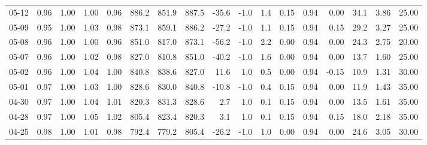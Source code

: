 \begin{threeparttable}
{\begin{tabular}{lrrrrrrrrrrrrrrrr}
  05-12 &         0.96 &           1.00 &          1.00 &          0.96 & 886.2 & 851.9 & 887.5 &      -35.6 &                     -1.0 &                 1.4 &       0.15 &      0.94 &           0.00 &             34.1 &            3.86 &                  25.00 \\
  05-09 &         0.95 &           1.00 &          1.03 &          0.98 & 873.1 & 859.1 & 886.2 &      -27.2 &                     -1.0 &                 1.1 &       0.15 &      0.94 &           0.15 &             29.2 &            3.27 &                  25.00 \\
  05-08 &         0.96 &           1.00 &          1.00 &          0.96 & 851.0 & 817.0 & 873.1 &      -56.2 &                     -1.0 &                 2.2 &       0.00 &      0.94 &           0.00 &             24.3 &            2.75 &                  20.00 \\
  05-07 &         0.96 &           1.00 &          1.02 &          0.98 & 827.0 & 810.8 & 851.0 &      -40.2 &                     -1.0 &                 1.6 &       0.00 &      0.94 &           0.00 &             13.7 &            1.60 &                  25.00 \\
  05-02 &         0.96 &           1.00 &          1.04 &          1.00 & 840.8 & 838.6 & 827.0 &       11.6 &                      1.0 &                 0.5 &       0.00 &      0.94 &          -0.15 &             10.9 &            1.31 &                  30.00 \\
  05-01 &         0.97 &           1.00 &          1.03 &          1.00 & 828.6 & 830.0 & 840.8 &      -10.8 &                     -1.0 &                 0.4 &       0.15 &      0.94 &           0.00 &             11.9 &            1.43 &                  35.00 \\
  04-30 &         0.97 &           1.00 &          1.04 &          1.01 & 820.3 & 831.3 & 828.6 &        2.7 &                      1.0 &                 0.1 &       0.15 &      0.94 &           0.00 &             13.5 &            1.61 &                  35.00 \\
  04-28 &         0.97 &           1.00 &          1.05 &          1.02 & 805.4 & 823.4 & 820.3 &        3.1 &                      1.0 &                 0.1 &       0.15 &      0.94 &           0.15 &             18.0 &            2.18 &                  35.00 \\
  04-25 &         0.98 &           1.00 &          1.01 &          0.98 & 792.4 & 779.2 & 805.4 &      -26.2 &                     -1.0 &                 1.0 &       0.00 &      0.94 &           0.00 &             24.6 &            3.05 &                  30.00 \\

\end{tabular}}
\end{threeparttable}
